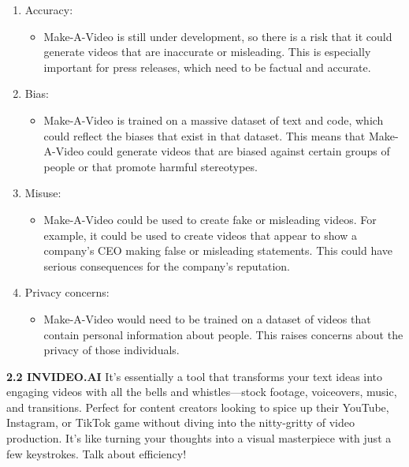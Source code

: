 \documentclass[12pt]{article}
\begin{document}
\begin{enumerate}
\item Accuracy: 
\begin{itemize}
\item Make-A-Video is still under development, so there is a risk that it could generate videos that are inaccurate or misleading. This is especially important for press releases, which need to be factual and accurate.
\end{itemize}

\item Bias: 
\begin{itemize}
\item  Make-A-Video is trained on a massive dataset of text and code, which could reflect the biases that exist in that dataset. This means that Make-A-Video could generate videos that are biased against certain groups of people or that promote harmful stereotypes.

\end{itemize}

\item Misuse: 
\begin{itemize}
\item Make-A-Video could be used to create fake or misleading videos. For example, it could be used to create videos that appear to show a company's CEO making false or misleading statements. This could have serious consequences for the company's reputation.

\end{itemize}

\item Privacy concerns: 

\begin{itemize}
\item Make-A-Video would need to be trained on a dataset of videos that contain personal information about people. This raises concerns about the privacy of those individuals.

\end{itemize}

\end{enumerate}
\bigskip
\bigskip
\noindent \fontsize{12}{12} \textbf{2.2 INVIDEO.AI}
\justify
\hspace{5mm}It's essentially a tool that transforms your text ideas into engaging videos with all the bells and whistles—stock footage, voiceovers, music, and transitions. Perfect for content creators looking to spice up their YouTube, Instagram, or TikTok game without diving into the nitty-gritty of video production. It's like turning your thoughts into a visual masterpiece with just a few keystrokes. Talk about efficiency!
\end{document}

